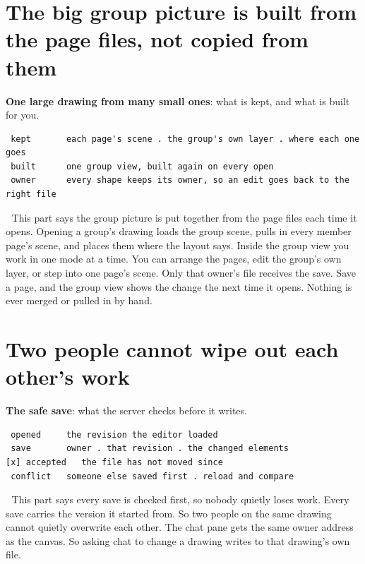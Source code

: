 \section{The big group picture is built from the page files, not copied from them}
\textbf{One large drawing from many small ones}: what is kept, and what is built for you.

\begin{verbatim}
 kept       each page's scene . the group's own layer . where each one goes
 built      one group view, built again on every open
 owner      every shape keeps its owner, so an edit goes back to the right file
\end{verbatim}
📌 This part says the group picture is put together from the page files each time it opens. Opening a group's drawing loads the group scene, pulls in every member page's scene, and places them where the layout says. Inside the group view you work in one mode at a time. You can arrange the pages, edit the group's own layer, or step into one page's scene. Only that owner's file receives the save. Save a page, and the group view shows the change the next time it opens. Nothing is ever merged or pulled in by hand.


\section{Two people cannot wipe out each other's work}
\textbf{The safe save}: what the server checks before it writes.

\begin{verbatim}
 opened     the revision the editor loaded
 save       owner . that revision . the changed elements
[x] accepted   the file has not moved since
 conflict   someone else saved first . reload and compare
\end{verbatim}
📌 This part says every save is checked first, so nobody quietly loses work. Every save carries the version it started from. So two people on the same drawing cannot quietly overwrite each other. The chat pane gets the same owner address as the canvas. So asking chat to change a drawing writes to that drawing's own file.

